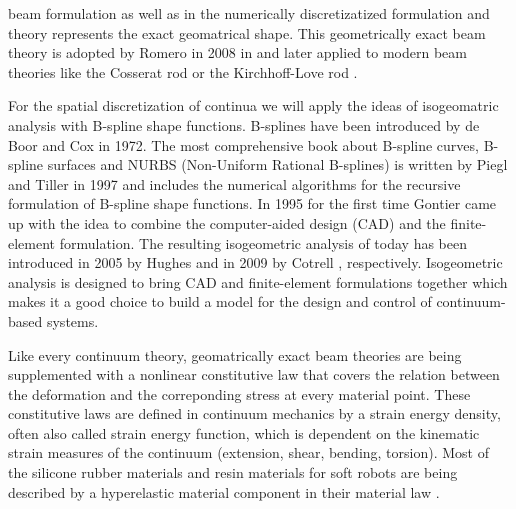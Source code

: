  beam formulation as well as in the numerically discretizatized formulation and theory represents the exact geomatrical shape. This geometrically exact beam theory is adopted
 by Romero in 2008 in \cite{Romero2008} and later applied to modern beam theories like the Cosserat rod \cite{Eugster2014_diss, Caasenbrood2021_conf} or the Kirchhoff-Love rod \cite{Meier2017}.
%
\par
For the spatial discretization of continua we will apply the ideas of isogeomatric analysis with B-spline shape functions.
B-splines have been introduced by de Boor \cite{Boor1972} and Cox \cite{Cox1972} in 1972. The most comprehensive book about B-spline curves, B-spline surfaces and
 NURBS (Non-Uniform Rational B-splines) is written by Piegl and Tiller \cite{Piegl1997_book} in 1997 and includes the numerical algorithms
for the recursive formulation of B-spline shape functions. In 1995 for the first time Gontier \cite{Gontier1995} came up with the idea to combine the
 computer-aided design (CAD) and the finite-element formulation. The resulting isogeometric analysis of today has been introduced in 2005 by Hughes \cite{Hughes2005} and in 2009 by
 Cotrell \cite{Cotrell2009}, respectively.
%
Isogeometric analysis is designed to bring CAD and finite-element formulations together which makes it a good choice to build a model for the design
and control of continuum-based systems. 
%
\par
Like every continuum theory, geomatrically exact beam theories are being supplemented with a nonlinear constitutive law that covers the relation between the deformation and the correponding stress
at every material point. 
These constitutive laws are defined in continuum mechanics by a strain energy density, often also called strain energy function, which is dependent on the kinematic strain measures
of the continuum (extension, shear, bending, torsion). Most of the silicone rubber materials and resin materials for soft robots are being described by a hyperelastic material component in their material law \cite{Marechal2021}.
